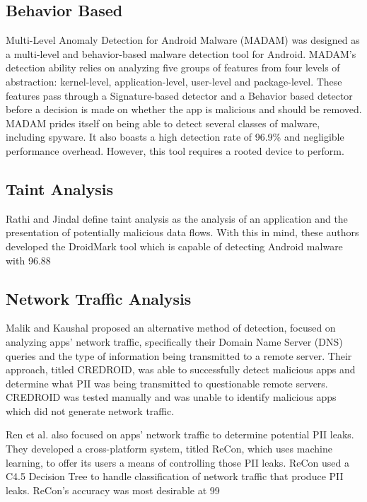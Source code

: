 \documentclass[conference]{IEEEtran}
\begin{document}
\subsection{Behavior Based}
Multi-Level Anomaly Detection for Android Malware (MADAM)  was designed as a multi-level and behavior-based malware detection tool for Android. MADAM’s detection ability relies on analyzing five groups of features from four levels of abstraction: kernel-level, application-level, user-level and package-level. These features pass through a Signature-based detector and a Behavior based detector before a decision is made on whether the app is malicious and should be removed. MADAM prides itself on being able to detect several classes of malware, including spyware. It also boasts a high detection rate of 96.9\% and negligible performance overhead. However, this tool requires a rooted device to perform.
\subsection{Taint Analysis}
Rathi and Jindal  define taint analysis as the analysis of an application and the presentation of potentially malicious data flows. With this in mind, these authors developed the DroidMark tool which is capable of detecting Android malware with 96.88%
\subsection{Network Traffic Analysis}
Malik and Kaushal  proposed an alternative method of detection, focused on analyzing apps’ network traffic, specifically their Domain Name Server (DNS) queries and the type of information being transmitted to a remote server. Their approach, titled CREDROID, was able to successfully detect malicious apps and determine what PII was being transmitted to questionable remote servers. CREDROID was tested manually
and was unable to identify malicious apps which did not generate network traffic.
\par Ren et al.  also focused on apps’ network traffic to determine potential PII leaks. They developed a cross-platform system, titled ReCon, which uses machine learning, to offer its users a means of controlling those PII leaks. ReCon used a C4.5 Decision Tree to handle classification of network traffic that produce PII leaks. ReCon’s accuracy was most desirable at 99%
\end{document}
